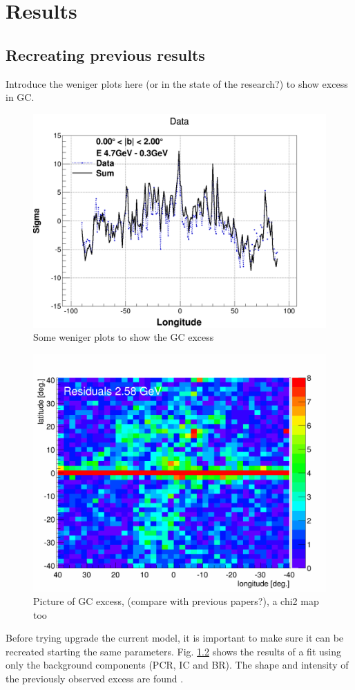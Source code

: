 \chapter{Results}
\label{ch:results}
%

\section{Recreating previous results}
\label{sec:results_recreating_prev_res}

Introduce the weniger plots here (or in the state of the research?) to show excess in GC.
\begin{figure}[h]
  \centering
  \includegraphics[width=.5\linewidth]{pic/results/Weniger_SUM_b0-2_E4,7-0,31GeV.png}
  \caption{Some weniger plots to show the GC excess}
  \label{fig:weniger_plot}
\end{figure}



\begin{figure}[h]
  \centering
  \includegraphics[width=.5\linewidth]{pic/results/BKGonly_halo_residuals.png}
  \caption{Picture of GC excess, (compare with previous papers?), a chi2 map too}
  \label{fig:original_GC_excess}
\end{figure}

Before trying upgrade the current model, it is important to make sure it can be recreated starting the same parameters. Fig. \ref{fig:original_GC_excess} shows the results of a fit using only the background components (PCR, IC and BR). The shape and intensity of the previously observed excess are found .\\

